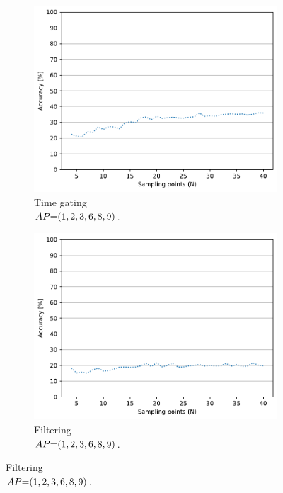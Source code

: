 \begin{figure}[ht]
  \begin{subfigure}{.49\textwidth}
    \centering
    \includegraphics[width=.99\linewidth]{Figures/RadarExperiments/Datasets/ThroughMaterials/PVC+Glass/samples-timegating-ud.pdf}
    \vspace{-15pt}
    \captionsetup{width=.99\linewidth}
    \caption{Time gating \\ $\splitatcommas{AP{=}(1, 2, 3, 6, 8, 9)}$.}
    \label{fig:radar-experiments:through-materials:pvc-glass-samples:timegating-ud}
  \end{subfigure}
  \begin{subfigure}{.49\textwidth}
    \centering
    \includegraphics[width=.99\linewidth]{Figures/RadarExperiments/Datasets/ThroughMaterials/PVC+Glass/samples-filtering-ud.pdf}  
    \vspace{-15pt}
    \captionsetup{width=.99\linewidth}
    \caption{Filtering \\ $\splitatcommas{AP{=}(1, 2, 3, 6, 8, 9)}$.}
    \label{fig:radar-experiments:through-materials:pvc-glass-samples:filtering-ud}
  \end{subfigure}


\end{figure}
